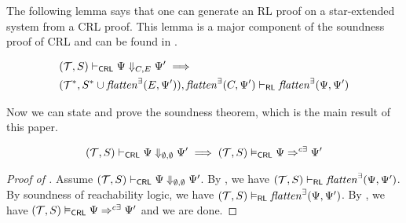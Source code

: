 The following lemma says that one can generate an RL proof on a star-extended system
from a CRL proof.
This lemma is a major component of the soundness proof of CRL and can be found in .
\begin{lemma}\label{lem:CRLalmostSoundness}
    \begin{align*}
        & (\mathcal{T}, S) \vdash_{\mathsf{CRL}} \Psi \Downarrow_{C,E} \Psi^\prime \implies \\
        &
        (\mathcal{T}^*, S^* \cup \mathit{flatten}^\exists(E, \Psi^\prime)), \mathit{flatten}^\exists(C, \Psi^\prime) \vdash_{\mathsf{RL}}
          \mathit{flatten}^\exists(\Psi, \Psi^\prime) 
    \end{align*}
\end{lemma}

Now we can state and prove the soundness theorem, which is the main result of this paper.
\begin{theorem}\label{thm:proofsystemSoundness}
\begin{equation*}
    (\mathcal{T}, S) \vdash_{\mathsf{CRL}} \Psi \Downarrow_{\emptyset,\emptyset} \Psi^\prime \implies
    (\mathcal{T}, S) \vDash_{\mathsf{CRL}} \Psi \Rightarrow^{c\exists} \Psi^\prime
\end{equation*}
\end{theorem}
\begin{proof}[Proof of ]
Assume $(\mathcal{T}, S) \vdash_{\mathsf{CRL}} \Psi \Downarrow_{\emptyset,\emptyset} \Psi^\prime$.
By , we have $(\mathcal{T}, S) \vdash_{\mathsf{RL}} \mathit{flatten}^\exists(\Psi, \Psi^\prime)$.
By soundness of reachability logic, we have $(\mathcal{T}, S) \vDash_{\mathsf{RL}} \mathit{flatten}^\exists(\Psi, \Psi^\prime)$.
By , 
we have $(\mathcal{T}, S) \vDash_{\mathsf{CRL}} \Psi \Rightarrow^{c\exists} \Psi^\prime$ and we are done.
\end{proof}



